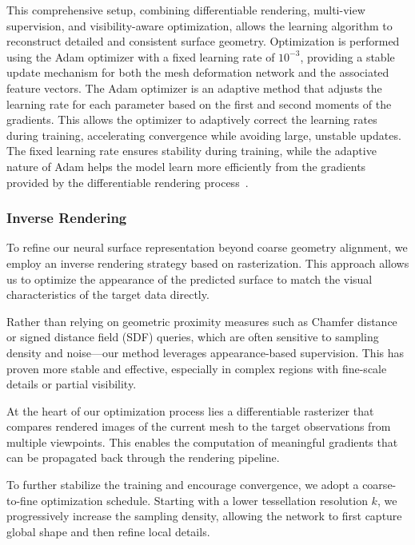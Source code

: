 This comprehensive setup, combining differentiable rendering, multi-view supervision, and visibility-aware optimization, allows the learning algorithm to reconstruct detailed and consistent surface geometry.  
Optimization is performed using the Adam optimizer with a fixed learning rate of $10^{-3}$, providing a stable update mechanism for both the mesh deformation network and the associated feature vectors.  
The Adam optimizer is an adaptive method that adjusts the learning rate for each parameter based on the first and second moments of the gradients.  
This allows the optimizer to adaptively correct the learning rates during training, accelerating convergence while avoiding large, unstable updates.  
The fixed learning rate ensures stability during training, while the adaptive nature of Adam helps the model learn more efficiently from the gradients provided by the differentiable rendering process~\cite{kingma2017}.  





\subsubsection{Inverse Rendering}

To refine our neural surface representation beyond coarse geometry alignment, we employ an inverse rendering strategy based on rasterization.  
This approach allows us to optimize the appearance of the predicted surface to match the visual characteristics of the target data directly.  

Rather than relying on geometric proximity measures such as Chamfer distance or signed distance field (SDF) queries, which are often sensitive to sampling density and noise—our method leverages appearance-based supervision.  
This has proven more stable and effective, especially in complex regions with fine-scale details or partial visibility.  

At the heart of our optimization process lies a differentiable rasterizer that compares rendered images of the current mesh to the target observations from multiple viewpoints.  
This enables the computation of meaningful gradients that can be propagated back through the rendering pipeline.  

To further stabilize the training and encourage convergence, we adopt a coarse-to-fine optimization schedule.  
Starting with a lower tessellation resolution $k$, we progressively increase the sampling density, allowing the network to first capture global shape and then refine local details.  

